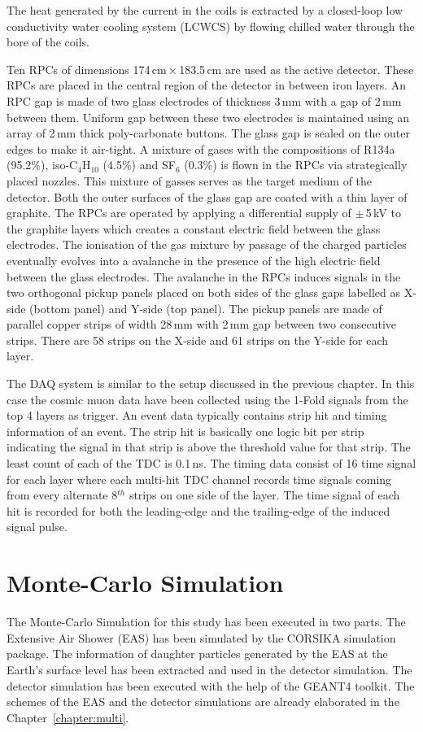 The heat generated by the current in the
coils is extracted by a closed-loop low conductivity water cooling
system (LCWCS) by flowing chilled water through the bore of the coils.

Ten RPCs of dimensions 174\,cm\,$\times$\,183.5\,cm are used as the
active detector. These RPCs are placed in the central region of
the detector in between iron layers.
An RPC gap is made of two glass electrodes of thickness 3\,mm with
a gap of 2\,mm between them. Uniform gap between these two electrodes
is maintained using an array of 2\,mm thick poly-carbonate buttons.
The glass gap is sealed on the outer edges to make it air-tight.
A mixture of gases with the compositions of R134a (95.2\%),
iso-C$_4$H$_{10}$ (4.5\%) and SF$_6$ (0.3\%) is flown in the RPCs
via strategically placed nozzles. This mixture of gasses serves as the
target medium of the detector.
Both the outer surfaces of the glass gap are coated with a thin layer
of graphite. The RPCs are operated by applying a differential supply of
$\pm$\,5\,kV to the graphite layers which creates a constant electric
field between the glass electrodes. The ionisation of the gas mixture
by passage of the charged particles eventually evolves into a
avalanche in the presence of the high electric field between the glass
electrodes. The avalanche in the RPCs induces signals in the two
orthogonal pickup panels placed on both sides of the glass gaps
labelled as X-side (bottom panel) and Y-side (top panel). The pickup
panels are made of parallel
copper strips of width 28\,mm with 2\,mm gap between two consecutive
strips. There are 58 strips on the X-side and 61 strips on the
Y-side for each layer.

The DAQ system is similar to the setup discussed in the previous
chapter. In this case the cosmic muon data have been collected using
the 1-Fold signals from the top 4 layers as trigger.
An event data typically contains strip hit and timing information
of an event. The strip hit is basically one logic bit per strip
indicating the signal in that strip is above the threshold value
for that strip. The least count of each of the TDC is 0.1\,ns.
The timing data consist of 16 time signal for
each layer where each multi-hit TDC channel records time signals
coming from every alternate 8$^{th}$ strips on one side of the layer.
The time signal of each hit is recorded for both the leading-edge and
the trailing-edge of the induced signal pulse.

\section{Monte-Carlo Simulation}
The Monte-Carlo Simulation for this study has been executed in
two parts. The Extensive Air Shower (EAS) has been simulated
by the CORSIKA simulation package\cite{corsika763}. The information
of daughter particles generated by the EAS at the Earth's surface
level has been extracted and used in the detector simulation.
The detector simulation has been executed with the help
of the GEANT4 toolkit\cite{geant4}. The schemes of the EAS and the
detector simulations are already elaborated in the
Chapter~\ref{chapter:multi}.

